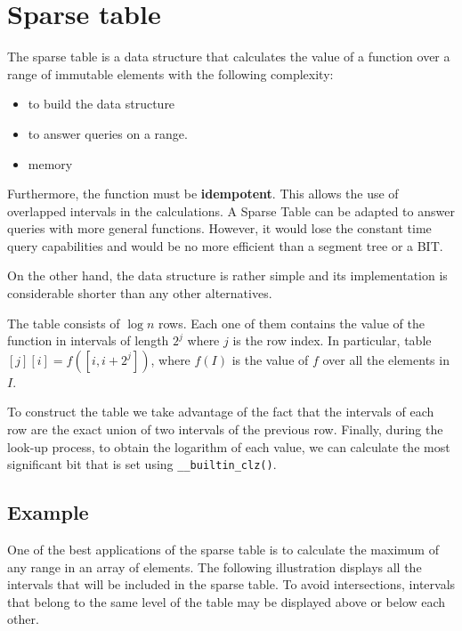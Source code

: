 \newpage


\section{Sparse table}
The sparse table is a data structure that calculates the value of 
a function over a range of immutable elements with the following complexity:
\begin{itemize}
		\setlength{\itemsep}{2 pt}
		\item {} to build the data structure
		\item {} to answer queries on a range. 
		\item {} memory
\end{itemize}
Furthermore, the function must be \textbf{idempotent}. This allows the use of
overlapped intervals in the calculations. A Sparse Table can be adapted to 
answer queries with more general functions. However, it would lose the constant
time query capabilities and would be no more efficient than a segment tree or a BIT.


On the other hand, the data structure is rather simple and its implementation 
is considerable shorter than any other alternatives. 

The table consists of $\log n$ rows. Each one of them contains the value of the
function in intervals of length $2^j$ where $j$ is the row index. In particular,
table$[j][i]=f([i,i+2^j])$, where $f(I)$ is the value of $f$ over all the 
elements in $I$.

To construct the table we take advantage of the fact that the intervals of each
row are the exact union of two intervals of the previous row. Finally,
during the look-up process, to obtain the 
logarithm of each value, we can calculate the most significant bit that is set 
using \texttt{__builtin_clz()}.

\newpage
\subsection{Example}
One of the best applications of the sparse table is to calculate the maximum of 
any range in an array of elements. The following illustration displays all the 
intervals that will be included in the sparse table. To avoid intersections, 
intervals that belong to the same level of the table may be displayed above 
or below each other.

